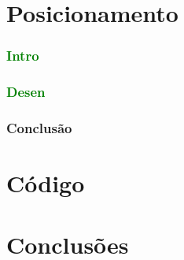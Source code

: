 

\section{Posicionamento}
\begin{frame}
\frametitle{\textcolor{green}{Intro}}
\end{frame}
\begin{frame}
\frametitle{\textcolor{green}{Desen}}
\end{frame}
\begin{frame}
\frametitle{Conclusão}
\end{frame}
\section{Código}
\begin{frame}
\end{frame}
\begin{frame}
\end{frame}
\begin{frame}
\end{frame}
\section{Conclusões}
\begin{frame}
\end{frame}

